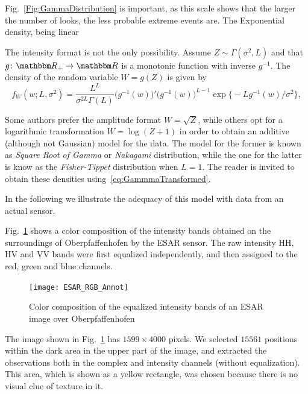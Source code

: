 \documentclass{beamer}
\begin{document}
\begin{frame} 
Fig.~\ref{Fig:GammaDistribution} is important, as this scale shows that the larger the number of looks, the less probable extreme events are.
The Exponential density, being linear

The intensity format is not the only possibility.
Assume $Z\sim\Gamma(\sigma^2,L)$ and that $g\colon\mathbbm R_+ \to \mathbbm R$ is a monotonic function with inverse $g^{-1}$.
The density of the random variable $W = g(Z)$ is given by 
\begin{equation}
f_W(w;L,\sigma^2) = \frac{L^L}{\sigma^{2L}\Gamma(L)} (g^{-1}(w)\big)' \big(g^{-1}(w)\big)^{L-1} 
	\exp\big\{ -L g^{-1}(w) / \sigma^2
	\big\},
	\label{eq:GammmaTransformed}
\end{equation}

Some authors prefer the amplitude format $W=\sqrt{Z}$, while others opt for a logarithmic transformation $W=\log(Z+1)$ in order to obtain an additive (although not Gaussian) model for the data.
The model for the former is known as \textit{Square Root of Gamma} or \textit{Nakagami} distribution,
while the one for the latter is know as the \textit{Fisher-Tippet} distribution when $L=1$.
The reader is invited to obtain these densities using~\eqref{eq:GammmaTransformed}.
\end{frame}

\begin{frame} 
In the following we illustrate the adequacy of this model with data from an actual sensor.

Fig.~\ref{Im:Oberpfaffenhofen_RGB} shows a color composition of the intensity bands obtained on the surroundings of Oberpfaffenhofen by the ESAR sensor.
The raw intensity HH, HV and VV bands were first equalized independently, and then assigned to the red, green and blue channels.

\begin{figure}
\centering
\texttt{[image: ESAR\_RGB\_Annot]}
\caption{Color composition of the equalized intensity bands of an ESAR image over Oberpfaffenhofen}\label{Im:Oberpfaffenhofen_RGB}
\end{figure}
\end{frame}

\begin{frame}
The image shown in Fig.~\ref{Im:Oberpfaffenhofen_RGB} has $1599\times4000$ pixels.
We selected $15561$ positions within the dark area in the upper part of the image, and extracted the observations both in the complex and intensity channels (without equalization).
This area, which is shown as a yellow rectangle, was chosen because there is no visual clue of texture in it.
\end{frame}
\end{document}
